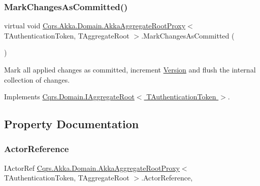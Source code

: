 \subsubsection{\texorpdfstring{Mark\+Changes\+As\+Committed()}{MarkChangesAsCommitted()}}
{\footnotesize\ttfamily virtual void \hyperlink{classCqrs_1_1Akka_1_1Domain_1_1AkkaAggregateRootProxy}{Cqrs.\+Akka.\+Domain.\+Akka\+Aggregate\+Root\+Proxy}$<$ T\+Authentication\+Token, T\+Aggregate\+Root $>$.Mark\+Changes\+As\+Committed (\begin{DoxyParamCaption}{ }\end{DoxyParamCaption})\hspace{0.3cm}{\ttfamily [virtual]}}



Mark all applied changes as committed, increment \hyperlink{classCqrs_1_1Akka_1_1Domain_1_1AkkaAggregateRootProxy_a24ff2ddef0d416ac5b936c1887ac2154_a24ff2ddef0d416ac5b936c1887ac2154}{Version} and flush the internal collection of changes. 



Implements \hyperlink{interfaceCqrs_1_1Domain_1_1IAggregateRoot_af31116870bbf6566b3eec0b8bc02c6de_af31116870bbf6566b3eec0b8bc02c6de}{Cqrs.\+Domain.\+I\+Aggregate\+Root$<$ T\+Authentication\+Token $>$}.



\subsection{Property Documentation}
\mbox{\label{classCqrs_1_1Akka_1_1Domain_1_1AkkaAggregateRootProxy_ad85e7a51c716484df8e5e8ea9ff31351_ad85e7a51c716484df8e5e8ea9ff31351}} 
\subsubsection{\texorpdfstring{Actor\+Reference}{ActorReference}}
{\footnotesize\ttfamily I\+Actor\+Ref \hyperlink{classCqrs_1_1Akka_1_1Domain_1_1AkkaAggregateRootProxy}{Cqrs.\+Akka.\+Domain.\+Akka\+Aggregate\+Root\+Proxy}$<$ T\+Authentication\+Token, T\+Aggregate\+Root $>$.Actor\+Reference\hspace{0.3cm}{\ttfamily [get]}, {\ttfamily [set]}}

